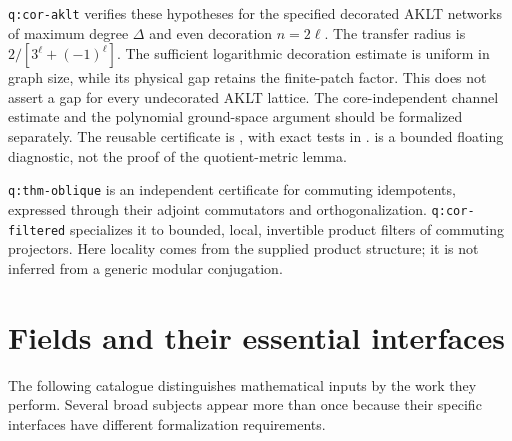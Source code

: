 \texttt{q:cor-aklt} verifies these hypotheses for the specified
decorated AKLT networks of maximum degree $\Delta$ and even decoration
$n=2\ell$. The transfer radius is
$2/[3^\ell+(-1)^\ell]$. The sufficient logarithmic decoration estimate
is uniform in graph size, while its physical gap retains the finite-patch
factor. This does not assert a gap for every undecorated AKLT lattice.
The core-independent channel estimate and the polynomial
ground-space argument should be formalized separately.
The reusable certificate is
, with exact tests
in .
 is a bounded
floating diagnostic, not the proof of the quotient-metric lemma.

\texttt{q:thm-oblique} is an independent certificate for commuting
idempotents, expressed through their adjoint commutators and
orthogonalization. \texttt{q:cor-filtered} specializes it to bounded,
local, invertible product filters of commuting projectors. Here locality
comes from the supplied product structure; it is not inferred from a
generic modular conjugation.

\section{Fields and their essential interfaces}

The following catalogue distinguishes mathematical inputs by the work
they perform. Several broad subjects appear more than once because their
specific interfaces have different formalization requirements.

